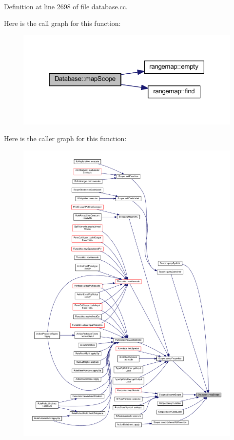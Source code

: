 Definition at line 2698 of file database.\+cc.

Here is the call graph for this function\+:
\nopagebreak
\begin{figure}[H]
\begin{center}
\leavevmode
\includegraphics[width=318pt]{class_database_ab3840564f424238dd3a498fdb1a02644_cgraph}
\end{center}
\end{figure}
Here is the caller graph for this function\+:
\nopagebreak
\begin{figure}[H]
\begin{center}
\leavevmode
\includegraphics[width=350pt]{class_database_ab3840564f424238dd3a498fdb1a02644_icgraph}
\end{center}
\end{figure}
\mbox{\label{class_database_a7e9120944fd4b8dbea1ae4b6a473e87f}} 
